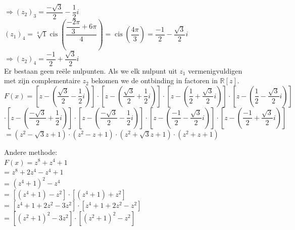 \documentclass[a4paper]{article}
\newcommand{\cis}{\operatorname{cis}}
\begin{document}
$\Rightarrow (z_2)_3 = \dfrac{-\sqrt{3}}{2} - \dfrac{1}{2}i$\\

$(z_1)_4 = \sqrt[4]{1} \cis\left(\dfrac{\dfrac{-2\pi}{3} + 6\pi}{4}\right) = \cis\left(\dfrac{4\pi}{3}\right) = \dfrac{-1}{2} - \dfrac{\sqrt{3}}{2}i$\\

$\Rightarrow (z_2)_4 = \dfrac{-1}{2} + \dfrac{\sqrt{3}}{2}i$\\

Er bestaan geen reële nulpunten. Als we elk nulpunt uit $z_1$ vermenigvuldigen \\

met zijn complementaire $z_2$ bekomen we de ontbinding in factoren in $\mathbb{R}[z]$.\\

$F(x) = \left[ z - \left(\dfrac{\sqrt{3}}{2} - \dfrac{1}{2}i \right)\right] \cdot \left[z - \left(\dfrac{\sqrt{3}}{2} + \dfrac{1}{2}i\right)\right] \cdot \left[z- \left(\dfrac{1}{2} + \dfrac{\sqrt{3}}{2}i\right)\right] \cdot \left[z- \left(\dfrac{1}{2} - \dfrac{\sqrt{3}}{2}i\right)\right]$\\

$\cdot \left[z- \left(\dfrac{-\sqrt{3}}{2} + \dfrac{1}{2}i\right)\right] \cdot \left[ z - \left(\dfrac{-\sqrt{3}}{2} - \dfrac{1}{2}i\right)\right] \cdot \left[z - \left(\dfrac{-1}{2} - \dfrac{\sqrt{3}}{2}i\right)\right] \cdot \left[z - \left(\dfrac{-1}{2} + \dfrac{\sqrt{3}}{2}i\right)\right]$\\

$= (z^2 - \sqrt{3}z + 1) \cdot (z^2 - z + 1) \cdot (z^2 + \sqrt{3}z + 1) \cdot (z^2 + z + 1) $\\

\bigskip

Andere methode:\\

$F(x) = z^8 + z^4 + 1$\\

= $z^8 + 2z^4 - z^4 + 1$\\

= $(z^4 + 1)^2 - z^4$\\

= $[(z^4 + 1) - z^2] \cdot [(z^4 + 1) + z^2]$\\

= $[z^4 + 1 + 2z^2 - 3z^2] \cdot [z^4 + 1 + 2z^2 - z^2]$\\

= $[(z^2 + 1)^2 - 3z^2] \cdot [(z^2 + 1)^2 - z^2]$\\
\end{document}
